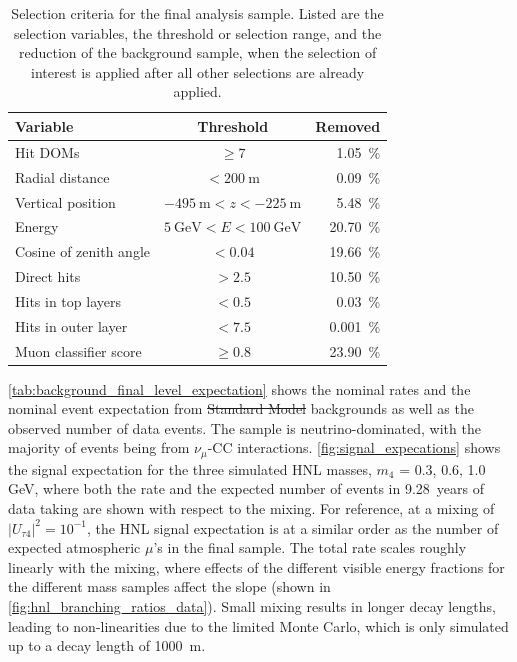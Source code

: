 \documentclass[
    aps,
    prd,
    reprint,
    amsmath,
    amssymb,
    nofootinbib,
    superscriptaddress,
    floatfix
]{revtex4-2}
\newcommand{\gev}{\giga\electronvolt}
\def\nomathut4{|U_{\tau4}|^2}
\providecommand{\DIFaddtex}[1]{{\protect\color{blue}\uwave{#1}}} %
\providecommand{\DIFdeltex}[1]{{\protect\color{red}\sout{#1}}}                      %
\providecommand{\DIFaddbegin}{} %
\providecommand{\DIFaddend}{} %
\providecommand{\DIFdelbegin}{} %
\providecommand{\DIFdelend}{} %
\providecommand{\DIFdelbeginFL}{} %
\providecommand{\DIFdelendFL}{} %
\providecommand{\DIFadd}[1]{\texorpdfstring{\DIFaddtex{#1}}{#1}} %
\providecommand{\DIFdel}[1]{\texorpdfstring{\DIFdeltex{#1}}{}} %
\newcommand{\DIFscaledelfig}{0.5}
\newlength{\DIFdelgraphicswidth} %
\newlength{\DIFdelgraphicsheight} %
\newcommand{\DIFaddincludegraphics}[2][]{{\color{blue}\fbox{\DIFOincludegraphics[#1]{#2}}}} %
\newcommand{\DIFdelincludegraphics}[2][]{%
\sbox{\DIFdelgraphicsbox}{\DIFOincludegraphics[#1]{#2}}%
\settoboxwidth{\DIFdelgraphicswidth}{\DIFdelgraphicsbox} %
\settoboxtotalheight{\DIFdelgraphicsheight}{\DIFdelgraphicsbox} %
\scalebox{\DIFscaledelfig}{%
\parbox[b]{\DIFdelgraphicswidth}{\usebox{\DIFdelgraphicsbox}\\[-\baselineskip] \rule{\DIFdelgraphicswidth}{0em}}\llap{\resizebox{\DIFdelgraphicswidth}{\DIFdelgraphicsheight}{%
\setlength{\unitlength}{\DIFdelgraphicswidth}%
\begin{picture}(1,1)%
\thicklines\linethickness{2pt} %
{\color[rgb]{1,0,0}\put(0,0){\framebox(1,1){}}}%
{\color[rgb]{1,0,0}\put(0,0){\line( 1,1){1}}}%
{\color[rgb]{1,0,0}\put(0,1){\line(1,-1){1}}}%
\end{picture}%
}\hspace*{3pt}}} %
} %
\DeclareRobustCommand{\DIFaddbegin}{\DIFOaddbegin \let\includegraphics\DIFaddincludegraphics} %
\DeclareRobustCommand{\DIFaddend}{\DIFOaddend \let\includegraphics\DIFOincludegraphics} %
\DeclareRobustCommand{\DIFdelbegin}{\DIFOdelbegin \let\includegraphics\DIFdelincludegraphics} %
\DeclareRobustCommand{\DIFdelend}{\DIFOaddend \let\includegraphics\DIFOincludegraphics} %
\DeclareRobustCommand{\DIFdelbeginFL}{\DIFOdelbeginFL \let\includegraphics\DIFdelincludegraphics} %
\DeclareRobustCommand{\DIFdelendFL}{\DIFOaddendFL \let\includegraphics\DIFOincludegraphics} %
\begin{document}
\begin{table}[h]
    \footnotesize
        \begin{tabular}{ lcr }
        \hline\hline    
        \textbf{Variable} & \textbf{Threshold} & \textbf{Removed} \\
        \hline\hline    
        Hit DOMs & $\geq 7$ & \SI{1.05}{\percent} \\
        Radial distance & $< \SI{200}{\meter}$ & \SI{0.09}{\percent} \\
        Vertical position & $\SI{-495}{\meter} < z < \SI{-225}{\meter}$ & \SI{5.48}{\percent} \\
        Energy & $\SI{5}{\gev} < E < \SI{100}{\gev}$ & \SI{20.70}{\percent} \\    
        Cosine of zenith angle & $< 0.04$ & \SI{19.66}{\percent} \\
        Direct hits & $> 2.5$ & \SI{10.50}{\percent} \\
        Hits in top layers & $< 0.5$ & \SI{0.03}{\percent} \\
        Hits in outer layer & $< 7.5$ & \SI{0.001}{\percent} \\
        Muon classifier score & $\geq 0.8$ & \SI{23.90}{\percent} \\
        \hline
        \end{tabular}
    \DIFdelbeginFL %
\DIFdelendFL \caption{Selection criteria for the final analysis sample. Listed are the selection variables, the threshold or selection range, and the reduction of the background sample, when the selection of interest is applied after all other selections are already applied.}
    \label{tab:analysis_cuts}
\end{table}

\cref{tab:background_final_level_expectation} shows the nominal rates and the nominal event expectation from \DIFdelbegin \DIFdel{Standard Model }\DIFdelend \DIFaddbegin \DIFadd{SM }\DIFaddend backgrounds as well as the observed number of data events. The sample is neutrino-dominated, with the majority of events being from $\nu_\mu$-CC interactions. \cref{fig:signal_expecations} shows the signal expectation for the three simulated HNL masses, $m_4$ = {0.3, 0.6, 1.0}\,GeV, where both the rate and the expected number of events in \SI{9.28}{years} of data taking are shown with respect to the mixing. For reference, at a mixing of $\nomathut4=10^{-1}$, the HNL signal expectation is at a similar order as the number of expected atmospheric $\mu$'s in the final sample. The total rate scales roughly linearly with the mixing, where effects of the different visible energy fractions for the different mass samples affect the slope (shown in \cref{fig:hnl_branching_ratios_data}). Small mixing results in longer decay lengths, leading to non-linearities due to the limited Monte Carlo, which is only simulated up to a decay length of \SI{1000}{\meter}.
\end{document}
